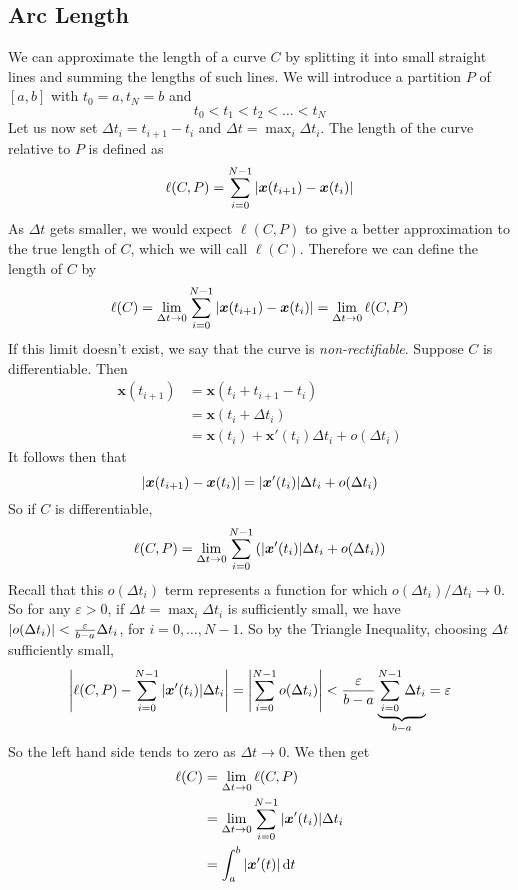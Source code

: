 \documentclass{article}
\begin{document}
\subsection{Arc Length}
We can approximate the length of a curve $C$ by splitting it into small straight lines and summing the lengths of such lines. We will introduce a partition $P$ of $[a, b]$ with $t_0 = a, t_N = b$ and
\[ t_0 < t_1 < t_2 < \dots < t_N \]
Let us now set $\Delta t_i = t_{i+1} - t_i$ and $\Delta t = \max_i \Delta t_i$. The length of the curve relative to $P$ is defined as
\[ \ell(C, P) = \sum_{i=0}^{N-1} \abs{\bm x(t_{i+1}) - \bm x(t_i)} \]
As $\Delta t$ gets smaller, we would expect $\ell(C, P)$ to give a better approximation to the true length of $C$, which we will call $\ell(C)$. Therefore we can define the length of $C$ by
\[ \ell(C) = \lim_{\Delta t \to 0} \sum_{i=0}^{N-1}\abs{\bm x(t_{i+1}) - \bm x(t_i)} = \lim_{\Delta t \to 0} \ell(C, P) \]
If this limit doesn't exist, we say that the curve is \textit{non-rectifiable}. Suppose $C$ is differentiable. Then
\begin{align*}
    \bm x(t_{i+1}) & = \bm x(t_i + t_{i+1} - t_i)                          \\
                   & = \bm x(t_i + \Delta t_i)                             \\
                   & = \bm x(t_i) + \bm x'(t_i) \Delta t_i + o(\Delta t_i)
\end{align*}
It follows then that
\[ \abs{\bm x(t_{i+1}) - \bm x(t_i)} = \abs{\bm x'(t_i)}\Delta t_i + o(\Delta t_i) \]
So if $C$ is differentiable,
\[
    \ell(C, P) = \lim_{\Delta t \to 0} \sum_{i=0}^{N-1} \left( \abs{\bm x'(t_i)}\Delta t_i + o(\Delta t_i)  \right)
\]
Recall that this $o(\Delta t_i)$ term represents a function for which $o(\Delta t_i) / \Delta t_i \to 0$. So for any $\varepsilon > 0$, if $\Delta t = \max_i \Delta t_i$ is sufficiently small, we have $\abs{o(\Delta t_i)} < \frac{\varepsilon}{b-a}\Delta t_i$, for $i = 0, \dots, N-1$. So by the Triangle Inequality, choosing $\Delta t$ sufficiently small,
\[
    \abs{\ell(C, P) - \sum_{i=0}^{N-1} \abs{\bm x'(t_i)}\Delta t_i} = \abs{\sum_{i=0}^{N-1} o(\Delta t_i)} < \frac{\varepsilon}{b-a}\underbrace{\sum_{i=0}^{N-1} \Delta t_i}_{b-a} = \varepsilon
\]
So the left hand side tends to zero as $\Delta t \to 0$. We then get
\begin{align*}
    \ell(C) & = \lim_{\Delta t \to 0} \ell(C, P)                                     \\
            & = \lim_{\Delta t \to 0} \sum_{i=0}^{N - 1} \abs{\bm x'(t_i)}\Delta t_i \\
            & = \int_a^b \abs{\bm x'(t)} \,\dd t
\end{align*}
\end{document}
